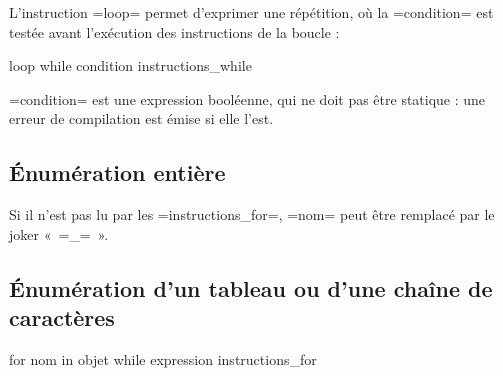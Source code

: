 L'instruction \plm=loop= permet d'exprimer une répétition, où la \plm=condition= est testée avant l'exécution des instructions de la boucle :
\begin{PLM}
loop while condition {
  instructions_while
}
\end{PLM}

\plm=condition= est une expression booléenne, qui ne doit pas être statique : une erreur de compilation est émise si elle l'est.














\subsection{Énumération entière}

Si il n'est pas lu par les \plm=instructions_for=, \plm=nom= peut être remplacé par le joker « \plm=_= ».




\subsection{Énumération d'un tableau ou d'une chaîne de caractères}

\begin{PLM}
for nom in objet while expression {
  instructions_for
}
\end{PLM}







































